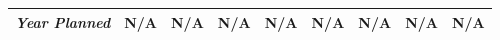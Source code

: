 \begin{tabularx}{\textwidth}{r|X|X|X|X|X|X|X|X|}
    \multicolumn{1}{|r|}{\cellcolor{ccorangelight}\textit{Year Planned}}                  & N/A                                                     & N/A                                                     & N/A                                                     & N/A                                                     & N/A                                                     & N/A                                                     & N/A                                                     & N/A                                                     \\ \hline
\end{tabularx}